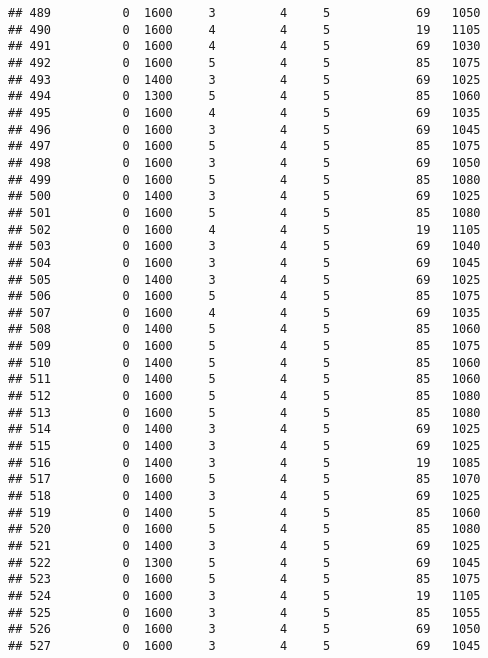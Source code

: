 \documentclass[]{article}
\begin{document}
\begin{verbatim}
## 489          0  1600     3         4     5            69   1050
## 490          0  1600     4         4     5            19   1105
## 491          0  1600     4         4     5            69   1030
## 492          0  1600     5         4     5            85   1075
## 493          0  1400     3         4     5            69   1025
## 494          0  1300     5         4     5            85   1060
## 495          0  1600     4         4     5            69   1035
## 496          0  1600     3         4     5            69   1045
## 497          0  1600     5         4     5            85   1075
## 498          0  1600     3         4     5            69   1050
## 499          0  1600     5         4     5            85   1080
## 500          0  1400     3         4     5            69   1025
## 501          0  1600     5         4     5            85   1080
## 502          0  1600     4         4     5            19   1105
## 503          0  1600     3         4     5            69   1040
## 504          0  1600     3         4     5            69   1045
## 505          0  1400     3         4     5            69   1025
## 506          0  1600     5         4     5            85   1075
## 507          0  1600     4         4     5            69   1035
## 508          0  1400     5         4     5            85   1060
## 509          0  1600     5         4     5            85   1075
## 510          0  1400     5         4     5            85   1060
## 511          0  1400     5         4     5            85   1060
## 512          0  1600     5         4     5            85   1080
## 513          0  1600     5         4     5            85   1080
## 514          0  1400     3         4     5            69   1025
## 515          0  1400     3         4     5            69   1025
## 516          0  1400     3         4     5            19   1085
## 517          0  1600     5         4     5            85   1070
## 518          0  1400     3         4     5            69   1025
## 519          0  1400     5         4     5            85   1060
## 520          0  1600     5         4     5            85   1080
## 521          0  1400     3         4     5            69   1025
## 522          0  1300     5         4     5            69   1045
## 523          0  1600     5         4     5            85   1075
## 524          0  1600     3         4     5            19   1105
## 525          0  1600     3         4     5            85   1055
## 526          0  1600     3         4     5            69   1050
## 527          0  1600     3         4     5            69   1045

\end{verbatim}
\end{document}

